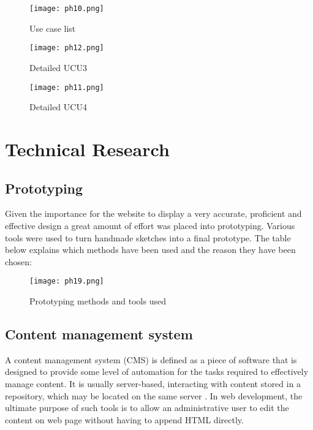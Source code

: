 \begin{figure}[H]
      \centering
      \texttt{[image: ph10.png]}
      \caption{Use case list}
 \end{figure}

\begin{figure}[H]
      \centering
      \texttt{[image: ph12.png]}
      \caption{Detailed UCU3}
 \end{figure}

\begin{figure}[H]
      \centering
      \texttt{[image: ph11.png]}
      \caption{Detailed UCU4}
 \end{figure}

\hypertarget{technical-research}{%
\section{Technical Research}\label{technical-research}}

\hypertarget{prototyping}{%
\subsection{Prototyping}\label{prototyping}}

Given the importance for the website to display a very accurate,
proficient and effective design a great amount of effort was placed into
prototyping. Various tools were used to turn handmade sketches into a
final prototype. The table below explains which methods have been used
and the reason they have been chosen:

\begin{figure}[H]
      \centering
      \texttt{[image: ph19.png]}
      \caption{Prototyping methods and tools used}
 \end{figure}

\hypertarget{content-management-system}{%
\subsection{Content management system}\label{content-management-system}}

A content management system (CMS) is defined as a piece of software that
is designed to provide some level of automation for the tasks required
to effectively manage content. It is usually server-based, interacting
with content stored in a repository, which may be located on the same
server \cite{p1} . In web development, the ultimate purpose of such
tools is to allow an administrative user to edit the content on web page
without having to append HTML directly.

